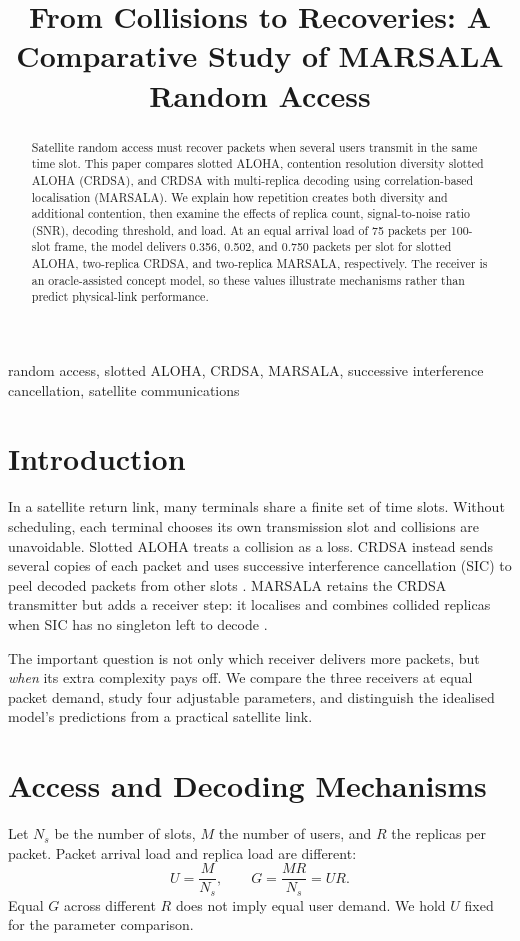\documentclass[conference]{IEEEtran}
\title{From Collisions to Recoveries: A Comparative Study of MARSALA Random Access}
\author{\IEEEauthorblockN{CESE4055 Group Project 2}
\IEEEauthorblockA{Ad Hoc and Sensor Networks}}
\begin{document}
\maketitle

\begin{abstract}
Satellite random access must recover packets when several users transmit in
the same time slot. This paper compares slotted ALOHA, contention resolution
diversity slotted ALOHA (CRDSA), and CRDSA with multi-replica decoding using
correlation-based localisation (MARSALA). We explain how repetition creates
both diversity and additional contention, then examine the effects of replica
count, signal-to-noise ratio (SNR), decoding threshold, and load. At an equal
arrival load of 75 packets per 100-slot frame, the model delivers 0.356,
0.502, and 0.750 packets per slot for slotted ALOHA, two-replica CRDSA, and
two-replica MARSALA, respectively. The receiver is an oracle-assisted concept
model, so these values illustrate mechanisms rather than predict physical-link
performance.
\end{abstract}

\begin{IEEEkeywords}
random access, slotted ALOHA, CRDSA, MARSALA, successive interference
cancellation, satellite communications
\end{IEEEkeywords}

\section{Introduction}
In a satellite return link, many terminals share a finite set of time slots.
Without scheduling, each terminal chooses its own transmission slot and
collisions are unavoidable. Slotted ALOHA treats a collision as a loss.
CRDSA instead sends several copies of each packet and uses successive
interference cancellation (SIC) to peel decoded packets from other slots
\cite{casini2007}. MARSALA retains the CRDSA transmitter but adds a receiver
step: it localises and combines collided replicas when SIC has no singleton
left to decode \cite{bui2015}.

The important question is not only which receiver delivers more packets, but
\emph{when} its extra complexity pays off. We compare the three receivers at
equal packet demand, study four adjustable parameters, and distinguish the
idealised model's predictions from a practical satellite link.

\section{Access and Decoding Mechanisms}
Let $N_s$ be the number of slots, $M$ the number of users, and $R$ the
replicas per packet. Packet arrival load and replica load are different:
\begin{equation}
U=\frac{M}{N_s}, \qquad G=\frac{MR}{N_s}=UR.
\label{eq:loads}
\end{equation}
Equal $G$ across different $R$ does not imply equal user demand. We hold
$U$ fixed for the parameter comparison.
\end{document}
